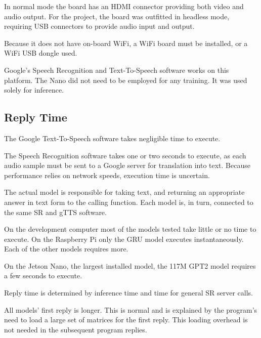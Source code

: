 In normal mode the board has an HDMI connector providing both video and audio output. For the project, the board was outfitted in headless mode, %
requiring USB connectors to provide audio input and output.

Because it does not have on-board WiFi, a WiFi board must be installed, or a WiFi USB dongle used.

Google's Speech Recognition and Text-To-Speech software works on this platform. The Nano did not need to be employed for any training. It was used solely for inference.



\subsection{Reply Time}

The Google Text-To-Speech software takes negligible time to execute.

The Speech Recognition software takes one or two seconds to execute, as each audio sample must be sent to a Google server for translation into text. Because performance relies on network speeds, execution time is uncertain.

The actual model is responsible for taking text, and returning an appropriate answer in text form to the calling function. Each model is, in turn, connected to the same SR and gTTS software.

On the development computer most of the models tested take little or no time to execute. On the Raspberry Pi only the GRU model executes instantaneously. Each of the other models requires more.  %

On the Jetson Nano, the largest installed model, the 117M GPT2 model requires a few seconds to execute. %

Reply time is determined by inference time and time for general SR server calls.

All models' first reply is longer. This is normal and is explained by the program's need to load a large set of matrices for the first reply. This loading overhead is not needed in the subsequent program replies. %

\label{setup-reply-time}

